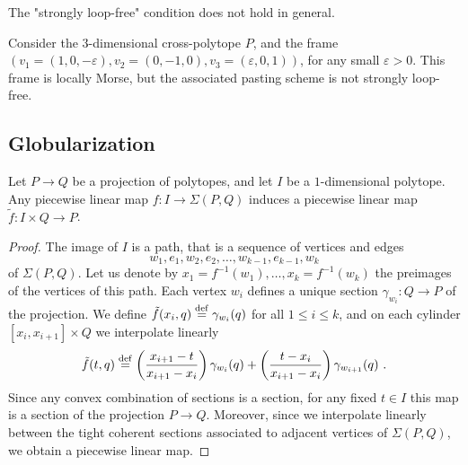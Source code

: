 
The "strongly loop-free" condition does not hold in general. 

\begin{example}
	Consider the $3$-dimensional cross-polytope $P$, and the frame $(v_1=(1,0,-\varepsilon),v_2=(0,-1,0),v_3=(\varepsilon,0,1))$, for any small $\varepsilon >0$. 
	This frame is locally Morse, but the associated pasting scheme is not strongly loop-free.
\end{example}

\subsection{Globularization} 
\label{ss:globularization}


\begin{lemma}
	\label{l:adjunction-I}
	Let $P \to Q$ be a projection of polytopes, and let $I$ be a $1$-dimensional polytope. 
	Any piecewise linear map $f \colon I \to \Sigma(P,Q)$ induces a piecewise linear map $\tilde f \colon I \times Q \to P$. 
\end{lemma}

\begin{proof}
	The image of $I$ is a path, that is a sequence of vertices and edges $$w_1,e_1,w_2,e_2,\ldots,w_{k-1},e_{k-1},w_k$$ of $\Sigma(P,Q)$. 
	Let us denote by $x_1=f^{-1}(w_1),\ldots, x_k=f^{-1}(w_k)$ the preimages of the vertices of this path. 
	Each vertex $w_i$ defines a unique section $\gamma_{w_i} : Q \to P$ of the projection.
	We define $\tilde f (x_i, q) \stackrel{\mathrm{def}}{=} \gamma_{w_i}(q)$ for all $1 \leq i \leq k$, and on each cylinder $[x_i,x_{i+1}] \times Q$ we interpolate linearly
	\[
	\tilde f (t,q) \defeq \left( \frac{x_{i+1}-t}{x_{i+1}-x_i} \right) \gamma_{w_i}(q) + \left( \frac{t-x_i}{x_{i+1}-x_i} \right) \gamma_{w_{i+1}}(q) \ .
	\]
	Since any convex combination of sections is a section, for any fixed $t\in I$ this map is a section of the projection $P \to Q$.
	Moreover, since we interpolate linearly between the tight coherent sections associated to adjacent vertices of $\Sigma(P,Q)$, we obtain a piecewise linear map. 
\end{proof}

